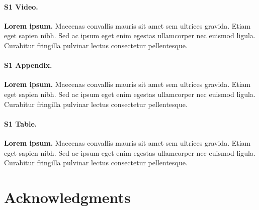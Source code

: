 \documentclass[10pt,letterpaper]{article}
\begin{document}
\paragraph*{S1 Video.}
\label{S1_Video}
{\bf Lorem ipsum.}  Maecenas convallis mauris sit amet sem ultrices gravida. Etiam eget sapien nibh. Sed ac ipsum eget enim egestas ullamcorper nec euismod ligula. Curabitur fringilla pulvinar lectus consectetur pellentesque.

\paragraph*{S1 Appendix.}
\label{S1_Appendix}
{\bf Lorem ipsum.} Maecenas convallis mauris sit amet sem ultrices gravida. Etiam eget sapien nibh. Sed ac ipsum eget enim egestas ullamcorper nec euismod ligula. Curabitur fringilla pulvinar lectus consectetur pellentesque.

\paragraph*{S1 Table.}
\label{S1_Table}
{\bf Lorem ipsum.} Maecenas convallis mauris sit amet sem ultrices gravida. Etiam eget sapien nibh. Sed ac ipsum eget enim egestas ullamcorper nec euismod ligula. Curabitur fringilla pulvinar lectus consectetur pellentesque.

\section*{Acknowledgments}


\nolinenumbers

%
%
% 

\end{document}
